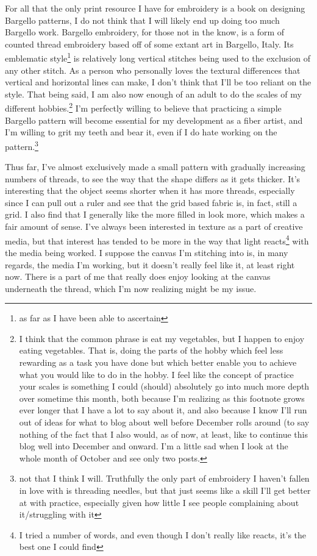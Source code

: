 \documentclass[12pt]{article}[titlepage]
\newcommand{\1}{\={a}}
\newcommand{\2}{\={e}}
\newcommand{\3}{\={\i}}
\newcommand{\4}{\=o}
\newcommand{\5}{\=u}
\newcommand{\6}{\={A}}
\renewcommand{\,}{\textsuperscript{,}}
\begin{document}
For all that the only print resource I have for embroidery is a book on designing Bargello patterns, I do not think that I will likely end up doing too much Bargello work.
Bargello embroidery, for those not in the know, is a form of counted thread embroidery based off of some extant art in Bargello, Italy.
Its emblematic style\footnote{as far as I have been able to ascertain} is relatively long vertical stitches being used to the exclusion of any other stitch.
As a person who personally loves the textural differences that vertical and horizontal lines can make, I don't think that I'll be too reliant on the style.
That being said, I am also now enough of an adult to do the scales of my different hobbies.\footnote{I think that the common phrase is eat my vegetables, but I happen to enjoy eating vegetables. That is, doing the parts of the hobby which feel less rewarding as a task you have done but which better enable you to achieve what you would like to do in the hobby.
I feel like the concept of practice your scales is something I could (should) absolutely go into much more depth over sometime this month, both because I'm realizing as this footnote grows ever longer that I have a lot to say about it, and also because I know I'll run out of ideas for what to blog about well before December rolls around (to say nothing of the fact that I also would, as of now, at least, like to continue this blog well into December and onward.
I'm a little sad when I look at the whole month of October and see only two posts.}
I'm perfectly willing to believe that practicing a simple Bargello pattern will become essential for my development as a fiber artist, and I'm willing to grit my teeth and bear it, even if I do hate working on the pattern.\footnote{not that I think I will. Truthfully the only part of embroidery I haven't fallen in love with is threading needles, but that just seems like a skill I'll get better at with practice, especially given how little I see people complaining about it/struggling with it}

Thus far, I've almost exclusively made a small pattern with gradually increasing numbers of threads, to see the way that the shape differs as it gets thicker.
It's interesting that the object seems shorter when it has more threads, especially since I can pull out a ruler and see that the grid based fabric is, in fact, still a grid.
I also find that I generally like the more filled in look more, which makes a fair amount of sense.
I've always been interested in texture as a part of creative media, but that interest has tended to be more in the way that light reacts\footnote{I tried a number of words, and even though I don't really like reacts, it's the best one I could find} with the media being worked.
I suppose the canvas I'm stitching into is, in many regards, the media I'm working, but it doesn't really feel like it, at least right now.
There is a part of me that really does enjoy looking at the canvas underneath the thread, which I'm now realizing might be my issue.
\end{document}
